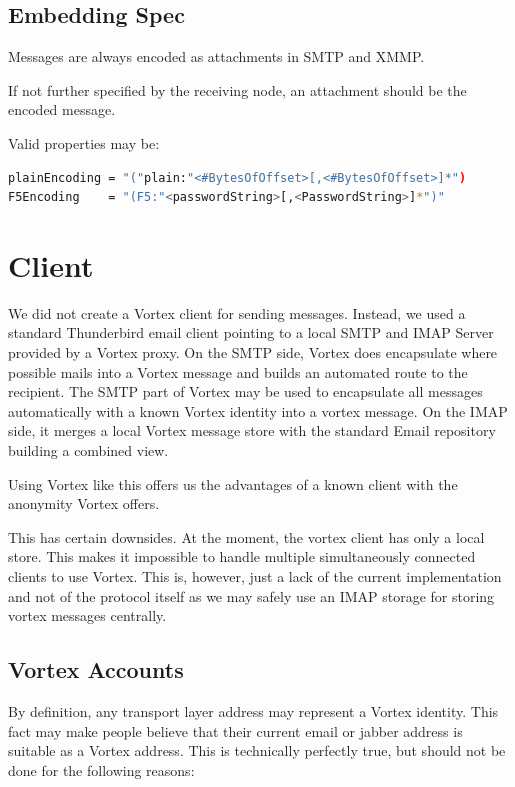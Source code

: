 \subsection{Embedding Spec}
Messages are always encoded as attachments in SMTP and XMMP. 

If not further specified by the receiving node, an attachment should be the encoded message. 

Valid properties may be:
\begin{lstlisting}[language=bash]
plainEncoding = "("plain:"<#BytesOfOffset>[,<#BytesOfOffset>]*")
F5Encoding    = "(F5:"<passwordString>[,<PasswordString>]*")"
\end{lstlisting}

\section{Client}
We did not create a Vortex client for sending messages. Instead, we used a standard Thunderbird email client pointing to a local SMTP and IMAP Server provided by a Vortex proxy. On the SMTP side, Vortex does encapsulate where possible mails into a Vortex message and builds an automated route to the recipient. The SMTP part of Vortex may be used to encapsulate all messages automatically with a known Vortex identity into a vortex message. On the IMAP side, it merges a local Vortex message store with the standard Email repository building a combined view.

Using Vortex like this offers us the advantages of a known client with the anonymity Vortex offers.

This has certain downsides. At the moment, the vortex client has only a local store. This makes it impossible to handle multiple simultaneously connected clients to use Vortex. This is, however, just a lack of the current implementation and not of the protocol itself as we may safely use an IMAP storage for storing vortex messages centrally.

\subsection{Vortex Accounts}
By definition, any transport layer address may represent a Vortex identity. This fact may make people believe that their current email or jabber address is suitable as a Vortex address. This is technically perfectly true, but should not be done for the following reasons:

